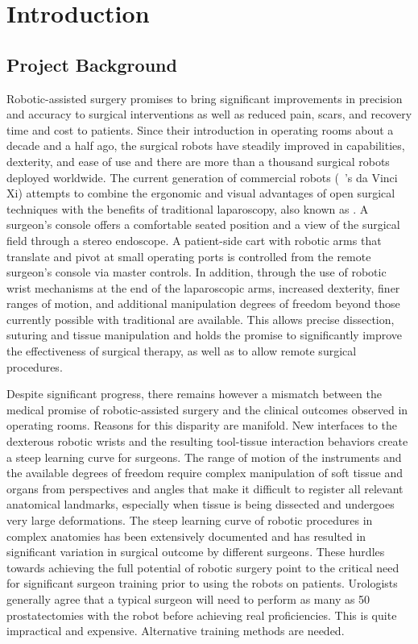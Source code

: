 
\chapter{Introduction}
\label{chp:introduction}

\section{Project Background}
\label{sec:background}
Robotic-assisted surgery promises to bring significant improvements in precision and accuracy to surgical interventions as well as reduced pain, scars, and recovery time and cost to patients. Since their introduction in operating rooms about a decade and a half ago, the surgical robots have steadily improved in capabilities, dexterity, and ease of use and there are more than a thousand surgical robots deployed worldwide. The current generation of commercial robots (\eg\ 's da Vinci Xi) attempts to combine the ergonomic and visual advantages of open surgical techniques with the benefits of traditional laparoscopy, also known as . A surgeon's console offers a comfortable seated position and a  view of the surgical field through a stereo endoscope. A patient-side cart with robotic arms that translate and pivot at small operating ports is controlled from the remote surgeon's console via master controls. In addition, through the use of robotic wrist mechanisms at the end of the laparoscopic arms, increased dexterity, finer ranges of motion, and additional manipulation degrees of freedom beyond those currently possible with traditional  are available. This allows precise dissection, suturing and tissue manipulation and holds the promise to significantly improve the effectiveness of surgical therapy, as well as to allow remote surgical procedures.

Despite significant progress, there remains however a mismatch between the medical promise of robotic-assisted surgery and the clinical outcomes observed in operating rooms. Reasons for this disparity are manifold. New interfaces to the dexterous robotic wrists and the resulting tool-tissue interaction behaviors create a steep learning curve for surgeons. The range of motion of the instruments and the available degrees of freedom require complex manipulation of soft tissue and organs from perspectives and angles that make it difficult to register all relevant anatomical landmarks, especially when tissue is being dissected and undergoes very large deformations. The steep learning curve of robotic  procedures in complex anatomies has been extensively documented and has resulted in significant variation in surgical outcome by different surgeons. These hurdles towards achieving the full potential of robotic surgery point to the critical need for significant surgeon training prior to using the robots on patients. Urologists generally agree that a typical surgeon will need to perform as many as 50 prostatectomies with the robot before achieving real proficiencies. This is quite impractical and expensive. Alternative training methods are needed.

